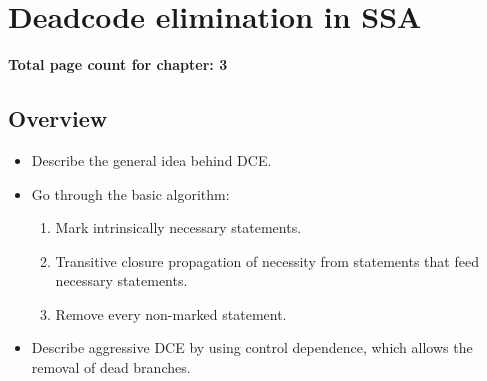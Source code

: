 \chapter{Deadcode elimination in SSA }

\textbf{Total page count for chapter: 3}

\section{Overview}

\begin{itemize}
\item	Describe the general idea behind DCE.

\item	Go through the basic algorithm:
	\begin{enumerate}
	\item	Mark intrinsically necessary statements.
	\item	Transitive closure propagation of necessity from
		statements that feed necessary statements.
	\item	Remove every non-marked statement.
	\end{enumerate}

\item	Describe aggressive DCE by using control dependence,
	which allows the removal of dead branches.
\end{itemize}
